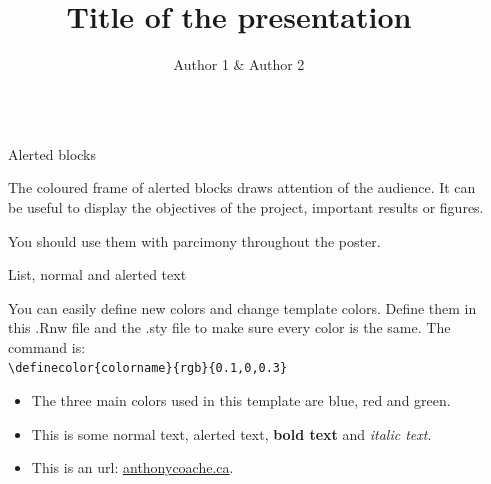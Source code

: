 \documentclass{beamer}
\title{\Huge Title of the presentation}
\author{Author 1  \&  Author 2}
\institute{Department, Name of the institution}
\newlength{\sepwid}
\newlength{\onecolwid}
\begin{document}
\setlength{\belowcaptionskip}{2ex}
\setlength\belowdisplayshortskip{2ex}

\begin{frame}[t, fragile]

\begin{columns}[t]

\begin{column}{\sepwid}\end{column}

\begin{column}{\onecolwid}


\begin{alertblock}{Alerted blocks}

  \large{
  The coloured frame of alerted blocks draws attention of the audience. It can be useful to display the objectives of the project, important results or figures.

  \vspace{0.25in}

  You should use them with parcimony throughout the poster.
  }
  
\end{alertblock}


\begin{block}{List, normal and alerted text}
	
	You can easily define new colors and change template colors. Define them in this .Rnw file and the .sty file to make sure every color is the same. The command is:\\ \small{\texttt{\textbackslash definecolor\{colorname\}\{rgb\}\{0.1,0,0.3\}}}
	
	\begin{itemize}
		\setlength{\itemsep}{20pt}
		\item The three main colors used in this template are \textcolor{mblue}{blue}, \textcolor{mred}{red} and \textcolor{mgreen}{green}. \\
		\item This is some normal text, \alert{alerted text}, \textbf{bold text} and \textit{italic text}. \\
		\item This is an url: \href{http://www.anthonycoache.ca}{anthonycoache.ca}.
	\end{itemize}
	

\end{block}
\end{column}
\end{columns}
\end{frame}
\end{document}
